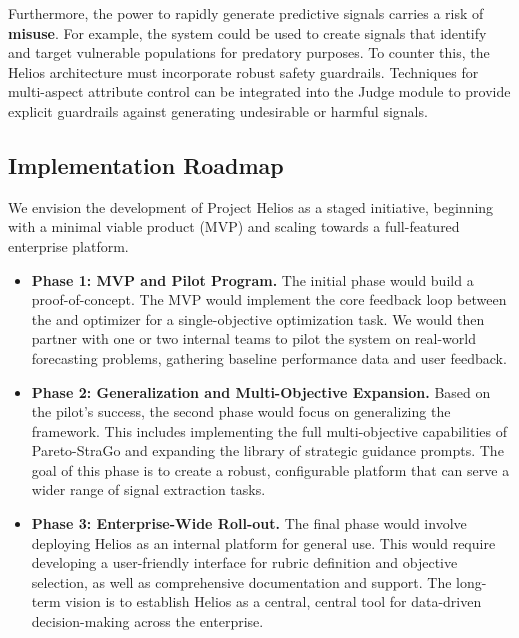 \documentclass{article}
\begin{document}
Furthermore, the power to rapidly generate predictive signals carries a risk of \textbf{misuse}. For example, the system could be used to create signals that identify and target vulnerable populations for predatory purposes. To counter this, the Helios architecture must incorporate robust safety guardrails. Techniques for multi-aspect attribute control \citep{zhang2024lightweightmultiaspectcontrolled, yu2024controlledtextgenerationblackbox} can be integrated into the Judge module to provide explicit guardrails against generating undesirable or harmful signals.

\subsection{Implementation Roadmap}
\label{subsec:implementation_roadmap}
We envision the development of Project Helios as a staged initiative, beginning with a minimal viable product (MVP) and scaling towards a full-featured enterprise platform.

\begin{itemize}
  \item \textbf{Phase 1: MVP and Pilot Program.} The initial phase would build a proof-of-concept. The MVP would implement the core feedback loop between the and optimizer for a single-objective optimization task. We would then partner with one or two internal teams to pilot the system on real-world forecasting problems, gathering baseline performance data and user feedback.
  \item \textbf{Phase 2: Generalization and Multi-Objective Expansion.} Based on the pilot's success, the second phase would focus on generalizing the framework. This includes implementing the full multi-objective capabilities of Pareto-StraGo and expanding the library of strategic guidance prompts. The goal of this phase is to create a robust, configurable platform that can serve a wider range of signal extraction tasks.
  \item \textbf{Phase 3: Enterprise-Wide Roll-out.} The final phase would involve deploying Helios as an internal platform for general use. This would require developing a user-friendly interface for rubric definition and objective selection, as well as comprehensive documentation and support. The long-term vision is to establish Helios as a central, central tool for data-driven decision-making across the enterprise.
\end{itemize}
\end{document}
